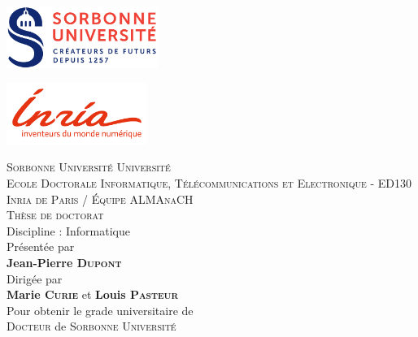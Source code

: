 
\begin{titlepage}

	\begin{center}
		\begin{minipage}[t]{0.4\textwidth}
			\includegraphics[height=2cm]{static/media/sorbonne}
		\end{minipage}%
		\hfill
		\begin{minipage}[t]{0.4\textwidth}
			\hfill
			\includegraphics[height=2cm]{static/media/inria}
		\end{minipage}

		\vspace{0.2cm}
		\LARGE \textsc{Sorbonne Université Université}\\
		\vspace{0.2cm}
		\normalsize \textsc{Ecole Doctorale Informatique, Télécommunications et Electronique} - ED130\\
		\vspace{0.2cm}
		\textsc{Inria de Paris / Équipe ALMAnaCH}\\

		\vspace{0.4cm}
		\Large \textsc{Thèse de doctorat}\\
		\normalsize Discipline : Informatique\\
		\vspace{0.4cm}
		\normalsize Présentée par \\
		\LARGE \textbf{Jean-Pierre \textsc{Dupont}}\\
		\vspace{0.4cm}
		\normalsize Dirigée par \\
		\Large \textbf{Marie \textsc{Curie}} et \textbf{Louis \textsc{Pasteur}}\\
		\vspace{0.4cm}
		\normalsize Pour obtenir le grade universitaire de\\
		\Large \textsc{Docteur} de \textsc{Sorbonne Université}


\end{center}
\end{titlepage}
